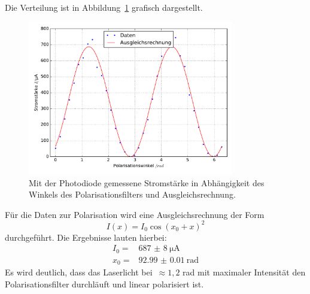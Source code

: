 %
Die Verteilung ist in Abbildung~\ref{fig:polarisation} grafisch dargestellt.
%
\begin{figure}[htb]
  \centering
  \includegraphics[width=0.8\textwidth]{auswertung/plot_polarisation.pdf}
  \caption{Mit der Photodiode gemessene Stromstärke in Abhängigkeit des Winkels des Polarisationsfilters und Ausgleichsrechnung.}
  \label{fig:polarisation}
\end{figure}
%
Für die Daten zur Polarisation wird eine Ausgleichsrechnung der Form
%
\begin{equation}
  I(x)=I_0\cos(x_0+x)^2
\end{equation}
%
durchgeführt. Die Ergebnisse lauten hierbei:
%
\begin{align*}
  I_0=&\SI{687(8)}{\micro\ampere} \\
  x_0=&\SI{92.99(1)}{}\text{rad}
\end{align*}
%
Es wird deutlich, dass das Laserlicht bei~$\approx 1,2$ rad mit maximaler Intensität den Polarisationsfilter durchläuft und linear polarisiert ist.
%
